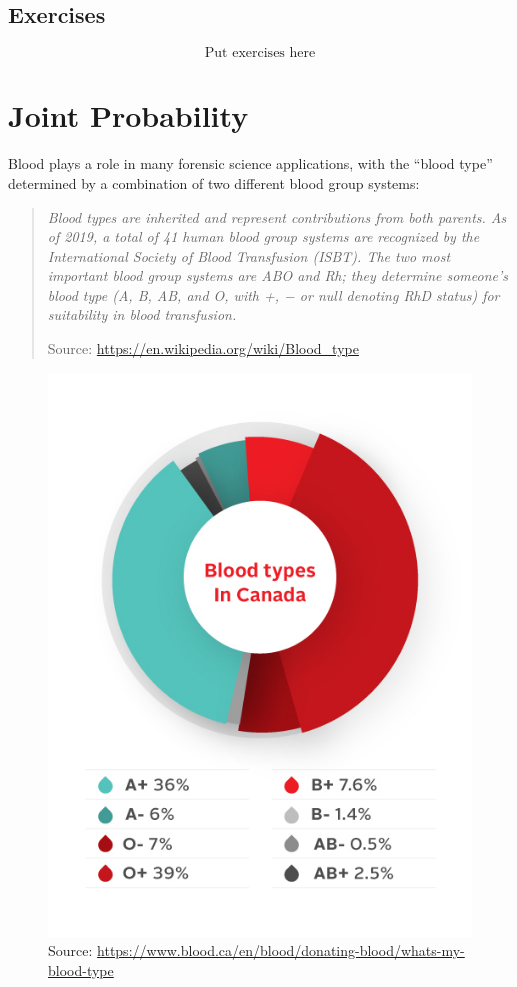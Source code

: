\documentclass[
]{book}
\begin{document}
\hypertarget{exercises}{%
\section{Exercises}\label{exercises}}

\[\mbox{Put exercises here}\]

\hypertarget{joint-probability}{%
\chapter{Joint Probability}\label{joint-probability}}

Blood plays a role in many forensic science applications, with the ``blood
type'' determined by a combination of two different blood group systems:

\begin{quote}
\emph{Blood types are inherited and represent contributions from both parents.
As of 2019, a total of 41 human blood group systems are recognized by the
International Society of Blood Transfusion (ISBT). The two most
important blood group systems are ABO and Rh; they determine someone's
blood type (A, B, AB, and O, with +, − or null denoting RhD status)
for suitability in blood transfusion.}

Source: \url{https://en.wikipedia.org/wiki/Blood_type}
\end{quote}

\begin{figure}
\centering
\includegraphics{images/BloodType-PieGraph_0.jpg}
\caption{Source: \url{https://www.blood.ca/en/blood/donating-blood/whats-my-blood-type}}
\end{figure}
\end{document}
